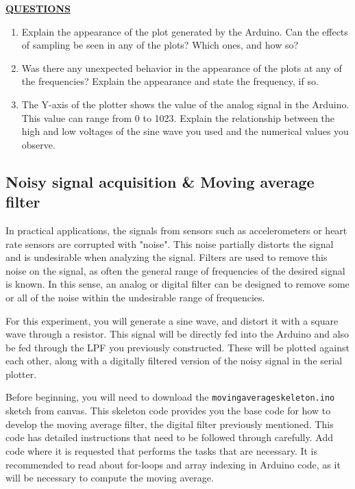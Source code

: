 \documentclass[12pt]{article}
\begin{document}
\textbf{\underline{QUESTIONS}}
\begin{enumerate}
    \item Explain the appearance of the plot generated by the Arduino. Can the effects of sampling be seen in any of the plots? Which ones, and how so?
        \fillwithlines{1in}
        
    \item Was there any unexpected behavior in the appearance of the plots at any of the frequencies? Explain the appearance and state the frequency, if so.
        \fillwithlines{1in}
    
    \item The Y-axis of the plotter shows the value of the analog signal in the Arduino. This value can range from 0 to 1023. Explain the relationship between the high and low voltages of the sine wave you used and the numerical values you observe.
        \fillwithlines{1in}
\end{enumerate}  

\checkoffsubsub

\subsection{Noisy signal acquisition \& Moving average filter}

In practical applications, the signals from sensors such as accelerometers or heart rate sensors are corrupted with "noise". This noise partially distorts the signal and is undesirable when analyzing the signal. Filters are used to remove this noise on the signal, as often the general range of frequencies of the desired signal is known. In this sense, an analog or digital filter can be designed to remove some or all of the noise within the undesirable range of frequencies. 

For this experiment, you will generate a sine wave, and distort it with a square wave through a resistor. This signal will be directly fed into the Arduino and also be fed through the LPF you previously constructed. These will be plotted against each other, along with a digitally filtered version of the noisy signal in the serial plotter.

Before beginning, you will need to download the \texttt{movingaverageskeleton.ino} sketch from canvas. This skeleton code provides you the base code for how to develop the moving average filter, the digital filter previously mentioned. This code has detailed instructions that need to be followed through carefully. Add code where it is requested that performs the tasks that are necessary. It is recommended to read about for-loops and array indexing in Arduino code, as it will be necessary to compute the moving average.
\end{document}
